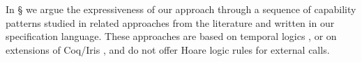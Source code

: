 \newcommand{\paragraphSDD}[1]{\vspace{.02cm}{\textit{#1}}}
 
In  \S {} we argue the expressiveness of our approach  through a sequence of capability patterns studied in related approaches from the literature  
 \cite{OOPSLA22,dd,VerX,irisWasm23,ddd} and written in our specification language.
These approaches %
 are based on temporal logics \cite{VerX,OOPSLA22}, or on extensions of Coq/Iris \cite{dd,irisWasm23,ddd}, and do not
offer Hoare logic  rules  for external calls.

 

